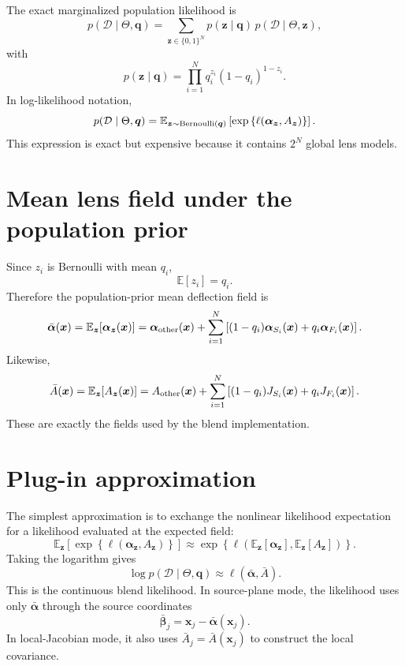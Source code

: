\documentclass[11pt]{article}
\newcommand{\data}{\mathcal{D}}
\newcommand{\E}{\mathbb{E}}
\begin{document}
The exact marginalized population likelihood is
\[
    p(\data\mid\Theta,\bm{q})
    =
    \sum_{\bm{z}\in\{0,1\}^N}
    p(\bm{z}\mid\bm{q})\,
    p(\data\mid\Theta,\bm{z}),
\]
with
\[
    p(\bm{z}\mid\bm{q})
    =
    \prod_{i=1}^N q_i^{z_i}(1-q_i)^{1-z_i}.
\]
In log-likelihood notation,
\[
    p(\data\mid\Theta,\bm{q})
    =
    \E_{\bm{z}\sim{\rm Bernoulli}(\bm{q})}
    \left[
        \exp\left\{
            \ell\!\left(\bm{\alpha}_{\bm{z}},A_{\bm{z}}\right)
        \right\}
    \right].
\]
This expression is exact but expensive because it contains $2^N$ global lens
models.

\section{Mean lens field under the population prior}

Since $z_i$ is Bernoulli with mean $q_i$,
\[
    \E[z_i]=q_i.
\]
Therefore the population-prior mean deflection field is
\[
    \bar{\bm{\alpha}}(\bm{x})
    =
    \E_{\bm{z}}\!\left[\bm{\alpha}_{\bm{z}}(\bm{x})\right]
    =
    \bm{\alpha}_{\rm other}(\bm{x})
    +
    \sum_{i=1}^N
    \left[
        (1-q_i)\bm{\alpha}_{S_i}(\bm{x})
        +
        q_i\bm{\alpha}_{F_i}(\bm{x})
    \right].
\]
Likewise,
\[
    \bar{A}(\bm{x})
    =
    \E_{\bm{z}}\!\left[A_{\bm{z}}(\bm{x})\right]
    =
    A_{\rm other}(\bm{x})
    +
    \sum_{i=1}^N
    \left[
        (1-q_i)J_{S_i}(\bm{x})
        +
        q_iJ_{F_i}(\bm{x})
    \right].
\]
These are exactly the fields used by the blend implementation.

\section{Plug-in approximation}

The simplest approximation is to exchange the nonlinear likelihood expectation
for a likelihood evaluated at the expected field:
\[
    \E_{\bm{z}}
    \left[
        \exp\left\{\ell(\bm{\alpha}_{\bm{z}},A_{\bm{z}})\right\}
    \right]
    \approx
    \exp\left\{
        \ell\!\left(
            \E_{\bm{z}}[\bm{\alpha}_{\bm{z}}],
            \E_{\bm{z}}[A_{\bm{z}}]
        \right)
    \right\}.
\]
Taking the logarithm gives
\[
    \boxed{
    \log p(\data\mid\Theta,\bm{q})
    \approx
    \ell\!\left(\bar{\bm{\alpha}},\bar{A}\right).
    }
\]
This is the continuous blend likelihood. In source-plane mode, the likelihood
uses only $\bar{\bm{\alpha}}$ through the source coordinates
\[
    \bar{\bm{\beta}}_j
    =
    \bm{x}_j-\bar{\bm{\alpha}}(\bm{x}_j).
\]
In local-Jacobian mode, it also uses $\bar{A}_j=\bar{A}(\bm{x}_j)$ to construct
the local covariance.
\end{document}
